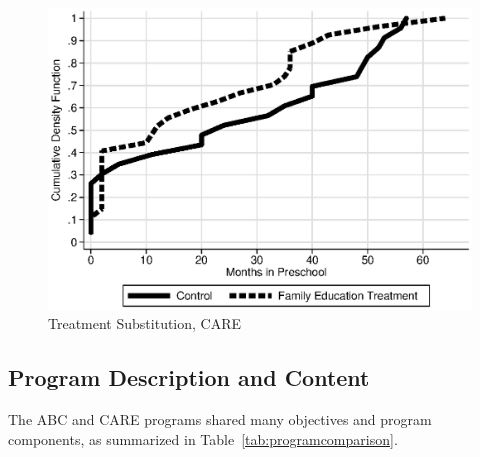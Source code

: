 \begin{figure}[H]
		\caption{Treatment Substitution, CARE} \label{fig:treatsubcare}
		\includegraphics[width=.9\columnwidth]{output/care_controlcontamination_months.eps}
\end{figure}
 
\subsection{Program Description and Content}

\noindent The ABC and CARE programs shared many objectives and program components, as summarized in Table~\ref{tab:programcomparison}.\\



